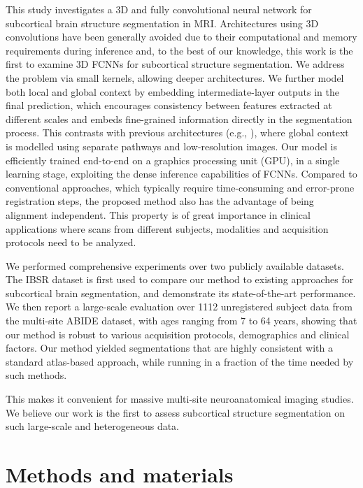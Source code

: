 \documentclass[twoside,fleqn,espcrc2]{elsarticle}
\begin{document}
This study investigates a 3D and fully convolutional neural network for subcortical brain structure segmentation in MRI. Architectures using 3D convolutions have been generally avoided due to their computational and memory requirements during inference and, to the best of our knowledge, this work is the first to examine 3D FCNNs for subcortical structure segmentation. We address the problem via small kernels, allowing deeper architectures. We further model both local and global context by embedding intermediate-layer outputs in the final prediction, which encourages consistency between features extracted at different scales and embeds fine-grained information directly in the segmentation process. This contrasts with previous architectures (e.g., \cite{kamnitsas2016efficient}), where global context is modelled using separate pathways and low-resolution images. Our model is efficiently trained end-to-end on a graphics processing unit (GPU), in a single learning stage, exploiting the dense inference capabilities of FCNNs. Compared to conventional approaches, which typically require time-con\-su\-ming and error-prone registration steps, the proposed method also has the advantage of being alignment independent. This property is of great importance in clinical applications where scans from different subjects, modalities and acquisition protocols need to be analyzed.

We performed comprehensive experiments over two publicly available datasets. The IBSR dataset is first used to compare our method to existing approaches for subcortical brain segmentation, and demonstrate its state-of-the-art performance. We then report a large-scale evaluation over 1112 unregistered subject data from the multi-site ABIDE dataset, with ages ranging from 7 to 64 years, showing that our method is robust to various acquisition protocols, demographics and clinical factors. Our method yielded segmentations that are highly consistent with a standard atlas-based approach, while running in a fraction of the time needed by such methods.

This makes it convenient for massive multi-site neuroanatomical imaging studies. We believe our work is the first to assess subcortical structure segmentation on such large-scale and heterogeneous data.

\section{Methods and materials}
\label{sec:methods}
\end{document}
